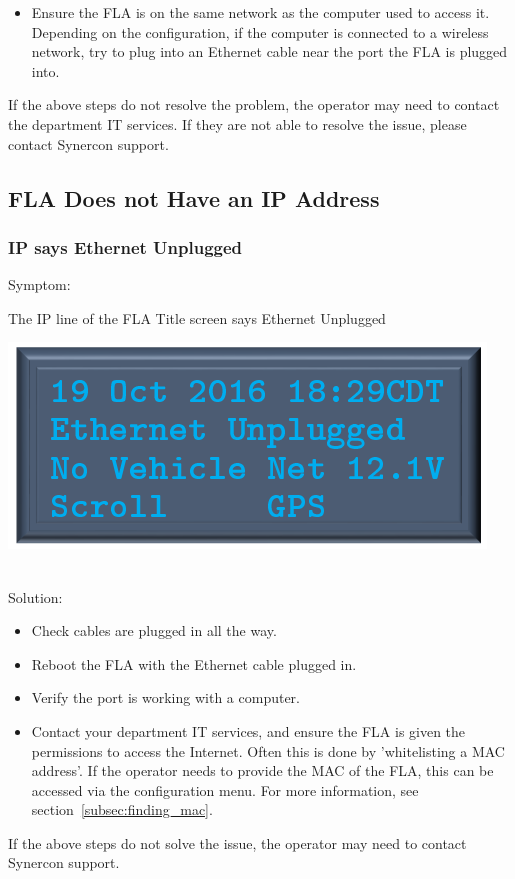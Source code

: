 \documentclass[11pt, oneside]{book}
\begin{document}
\begin{itemize}
\item Ensure the FLA is on the same network as the computer used to access it. Depending on the configuration, if the computer is connected to a wireless network, try to plug into an Ethernet cable near the port the FLA is plugged into.
\end{itemize}
If the above steps do not resolve the problem, the operator may need to contact the department IT services. If they are not able to resolve the issue, please contact Synercon support.

\subsection{FLA Does not Have an IP Address}
\subsubsection{IP says Ethernet Unplugged}
Symptom:\\
\noindent\begin{minipage}{0.45\textwidth}%
The IP line of the FLA Title screen says Ethernet Unplugged
\end{minipage}%
\hfill%
\begin{minipage}{0.45\textwidth}
\includegraphics[width=\linewidth]{../media/pstricks_files/01_main_screen_ethernet_unplugged}
\end{minipage}\\
Solution:\\
\begin{itemize}
\item Check cables are plugged in all the way.
\item Reboot the FLA with the Ethernet cable plugged in.
\item Verify the port is working with a computer.
\item Contact your department IT services, and ensure the FLA is given the permissions to access the Internet. Often this is done by 'whitelisting a MAC address'. If the operator needs to provide the MAC of the FLA, this can be accessed via the configuration menu. For more information, see section~\ref{subsec:finding_mac}.
\end{itemize}
If the above steps do not solve the issue, the operator may need to contact Synercon support.
\end{document}
